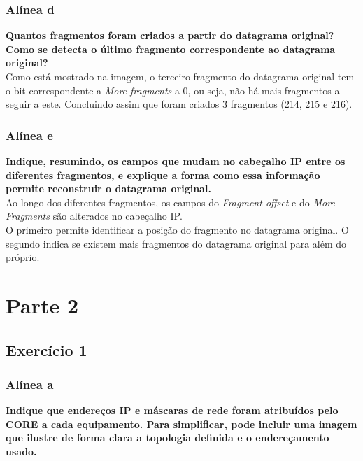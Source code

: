 \documentclass[a4paper]{report}
\begin{document}
\subsection{Alínea d}
\textbf{Quantos fragmentos foram criados a partir do datagrama original?
Como se detecta o último fragmento correspondente ao datagrama original?}\\
Como está mostrado na imagem, o terceiro fragmento do datagrama original
tem o bit correspondente a \textit{More fragments} a 0, ou seja, não há mais 
fragmentos a seguir a este. Concluindo assim que foram criados 3 fragmentos 
(214, 215 e 216).

\subsection{Alínea e}
\textbf{Indique, resumindo, os campos que mudam no cabeçalho IP entre os
diferentes fragmentos, e explique a forma como essa informação permite
reconstruir o datagrama original.}\\
Ao longo dos diferentes fragmentos, os campos do \textit{Fragment offset} e do
\textit{More Fragments} são alterados no cabeçalho IP.\\
O primeiro permite identificar a posição do fragmento no datagrama original. O
segundo indica se existem mais fragmentos do datagrama original para além do
próprio.


\chapter{Parte 2}

\section{Exercício 1}

\subsection{Alínea a}
\textbf{Indique que endereços IP e máscaras de rede foram atribuídos pelo CORE a cada
equipamento. Para simplificar, pode incluir uma imagem que ilustre de forma clara a
topologia definida e o endereçamento usado.}
\end{document}
